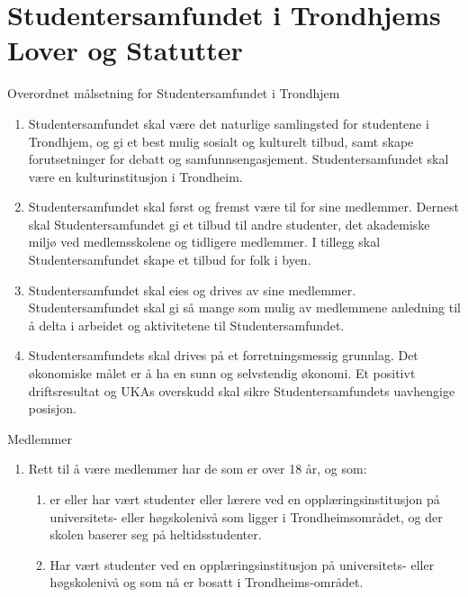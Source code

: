 
\chapter*{Studentersamfundet i Trondhjems Lover og Statutter}

\begin{lovkapittel}{}

\begin{lovparagraf}{Overordnet målsetning for Studentersamfundet i Trondhjem}

    \begin{enumerate}
        \item Studentersamfundet skal være det naturlige samlingsted for studentene i Trondhjem, og gi
            et best mulig sosialt og kulturelt tilbud, samt skape forutsetninger for debatt og
            samfunnsengasjement. Studentersamfundet skal være en kulturinstitusjon i Trondheim.
        \item Studentersamfundet skal først og fremst være til for sine medlemmer. Dernest
            skal Studentersamfundet gi et tilbud til andre studenter, det akademiske miljø
            ved medlemsskolene og tidligere medlemmer. I tillegg skal Studentersamfundet
            skape et tilbud for folk i byen.
	\item Studentersamfundet skal eies og drives av sine medlemmer. Studentersamfundet skal gi så mange som mulig 
	av medlemmene anledning til å delta i arbeidet og aktivitetene til Studentersamfundet.
	\item Studentersamfundets skal drives på et forretningsmessig grunnlag. Det økonomiske målet er å ha en sunn og 
	selvstendig økonomi. Et positivt driftsresultat og UKAs overskudd skal sikre Studentersamfundets
	uavhengige posisjon.

    \end{enumerate}
\end{lovparagraf}





\begin{lovparagraf}{Medlemmer}

  \begin{enumerate}
    \item Rett til å være medlemmer har de som er over 18 år, og som:
      
      \begin{enumerate}
      \item er eller har vært studenter eller lærere ved en opplæringsinstitusjon på universitets- eller høgskolenivå
      som ligger i Trondheimsområdet, og der skolen baserer seg på heltidsstudenter.
      \item Har vært studenter ved en opplæringsinstitusjon på universitets- eller høgskolenivå og som nå er bosatt i
      Trondheims-området.
      \end{enumerate}
      

\end{enumerate}
\end{lovparagraf}
\end{lovkapittel}
